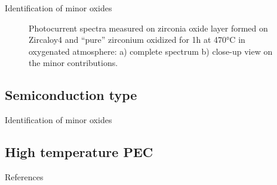 \documentclass[10pt,compress]{beamer}
\begin{document}
\begin{frame}[allowframebreaks=1.0]{Identification of minor oxides}
\begin{figure}[h]
        \caption{Photocurrent spectra measured on zirconia oxide layer formed on 
        Zircaloy4 and “pure” zirconium oxidized for 1h at 470°C in oxygenated 
        atmosphere\citep{benaboud2007}: a) complete spectrum b) close-up view on the minor contributions.}
        \label{fig_benaboud_minor_oxides}
    \end{figure}


\end{frame}

\subsection{Semiconduction type}
\begin{frame}{Identification of minor oxides}

\end{frame}

\subsection{High temperature PEC}





\begin{frame}[allowframebreaks=0.9]{References}
\AtNextBibliography{\tiny}
\nocite{*}
\printbibliography
\end{frame}
\end{document}
